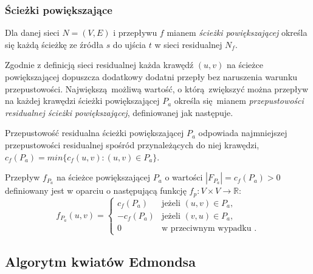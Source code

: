\subsubsection{Ścieżki powiększające}
  \par{
    \begin{definition}
      Dla danej sieci $N=(V,E)$ i przepływu $f$ mianem \emph{ścieżki powiększającej} określa się każdą ścieżkę ze źródła $s$ do ujścia $t$ w sieci residualnej $N_f$.
    \end{definition}
    Zgodnie z definicją sieci residualnej każda krawędź $(u, v)$ na ścieżce powiększającej dopuszcza dodatkowy dodatni przepły bez naruszenia warunku przepustowości.
    Największą możliwą wartość, o którą zwiększyć można przepływ na każdej krawędzi ścieżki powiększającej $P_a$ określa się mianem \emph{przepustowości residualnej ścieżki powiększającej}, definiowanej jak następuje.
    \begin{definition}
      Przepustowość residualna ścieżki powiększającej $P_a$ odpowiada najmniejszej przepustowości residualnej spośród przynależących do niej krawędzi, $c_f(P_a) = min\{c_f(u, v):(u, v)\in P_a\}$.
    \end{definition}
    \begin{definition}
      Przepływ $f_{P_a}$ na ścieżce powiększającej $P_a$ o wartości $|F_{P_a}| = c_f(P_a) > 0$ definiowany jest w oparciu o następującą funkcję $f_p: V \times V \rightarrow \mathbb{R}$: 
      \begin{equation*}
      f_{P_a}(u, v) = \left\{
      \begin{array}{rl}
      c_f(P_a) & \text{jeżeli } (u, v) \in P_a,\\
      -c_f(P_a) & \text{jeżeli } (v, u) \in P_a,\\
      0 & \text{w przeciwnym wypadku }.
      \end{array} \right.
      \end{equation*}
    \end{definition}
  }

\subsection{Algorytm kwiatów Edmondsa}\label{ss_edmonds}




